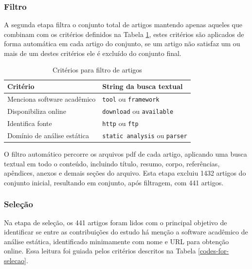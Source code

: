 \subsubsection{Filtro}


A segunda etapa filtra o conjunto total de artigos mantendo apenas aqueles que
combinam com os critérios definidos na Tabela \ref{codes-for-filter}, estes
critérios são aplicados de forma automática em cada artigo do conjunto, se um
artigo não satisfaz um ou mais de um destes critérios ele é excluído do
conjunto final.

\begin{table}[h]
\caption{Critérios para filtro de artigos}
\centering
\begin{tabular}{ l l }
  \hline
  Critério                        & String da busca textual               \\
  \hline
  Menciona software acadêmico     & {\tt tool} ou {\tt framework}         \\
  Disponibiliza online            & {\tt download} ou {\tt available}     \\
  Identifica fonte                & {\tt http} ou {\tt ftp}               \\
  Domínio de análise estática     & {\tt static analysis} ou {\tt parser} \\
  \hline
\end{tabular}
\label{codes-for-filter}
\end{table}

O filtro automático percorre os arquivos pdf de cada artigo, aplicando uma
busca textual em todo o conteúdo, incluindo título, resumo, corpo, referências,
apêndices, anexos e demais seções do arquivo. Esta etapa excluiu 1432 artigos
do conjunto inicial, resultando em conjunto, após filtragem, com 441 artigos.

\subsubsection{Seleção}

Na etapa de seleção, os 441 artigos foram lidos com o principal objetivo
de identificar se entre as contribuições do estudo há menção a software
acadêmico de análise estática, identificado minimamente com nome e URL para
obtenção online. 
Essa leitura foi guiada pelos critérios descritos na Tabela \ref{codes-for-selecao}.

